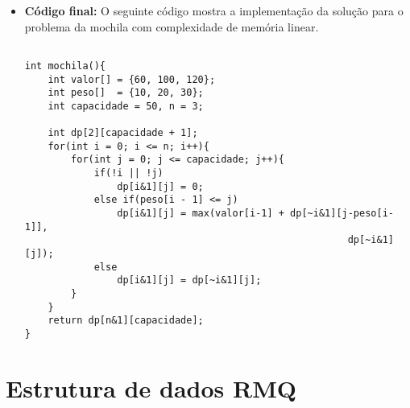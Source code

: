 \begin{itemize}[leftmargin=-.001in]
\item \textbf{Código final:} 
O seguinte código mostra a implementação da solução para o problema da mochila com complexidade de memória linear.
\begin{lstlisting}[caption={Implementação Mochila},label={lst:lis}]

int mochila(){
	int valor[] = {60, 100, 120};
	int peso[]  = {10, 20, 30};
	int capacidade = 50, n = 3;

	int dp[2][capacidade + 1];
	for(int i = 0; i <= n; i++){
		for(int j = 0; j <= capacidade; j++){
			if(!i || !j)
				dp[i&1][j] = 0;
			else if(peso[i - 1] <= j)
				dp[i&1][j] = max(valor[i-1] + dp[~i&1][j-peso[i-1]],
														dp[~i&1][j]);
			else
				dp[i&1][j] = dp[~i&1][j];
		}
	}
	return dp[n&1][capacidade]; 
}
\end{lstlisting}
\end{itemize}


\section{Estrutura de dados RMQ}

